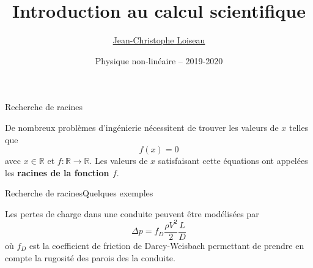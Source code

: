 \documentclass[usenames,dvipsnames,svgnames,10pt,aspectratio=169]{beamer}
\title[Nonlinear physics] %
{
	Introduction au calcul scientifique
}
\author[J.-Ch.~Loiseau] %
{
	\underline{Jean-Christophe Loiseau}
}
\institute[unused]
{
	\url{jean-christophe.loiseau@ensam.eu} \\
	Laboratoire DynFluid \\
	Arts et M\'etiers, France.
}
\date[unused]{Physique non-lin\'eaire -- 2019-2020}
\begin{document}
\titleframe	%


\begin{frame}[t, c]{Recherche de racines}{}
	\begin{minipage}{.68\textwidth}
    De nombreux problèmes d'ingénierie nécessitent de trouver les valeurs de $x$ telles que
    \[
    f(x) = 0
    \]
    avec $x \in \mathbb{R}$ et $f : \mathbb{R} \to \mathbb{R}$.
    Les valeurs de $x$ satisfaisant cette équations ont appelées les \alert{\textbf{racines de la fonction $f$}}.
	\end{minipage}%
	\hfill
	\begin{minipage}{.28\textwidth}
    \centering
	\end{minipage}

	\vspace{1cm}
\end{frame}

\begin{frame}[t, c]{Recherche de racines}{Quelques exemples}
  \begin{minipage}{.68\textwidth}
    Les pertes de charge dans une conduite peuvent être modélisées par
    \[
    \Delta p = f_D \dfrac{\rho V^2}{2} \dfrac{L}{D}
    \]
    où $f_D$ est la coefficient de friction de Darcy-Weisbach permettant de prendre en compte la rugosité des parois des la conduite.
  \end{minipage}%
  \hfill
  \begin{minipage}{.28\textwidth}
  \end{minipage}
\end{frame}
\end{document}
